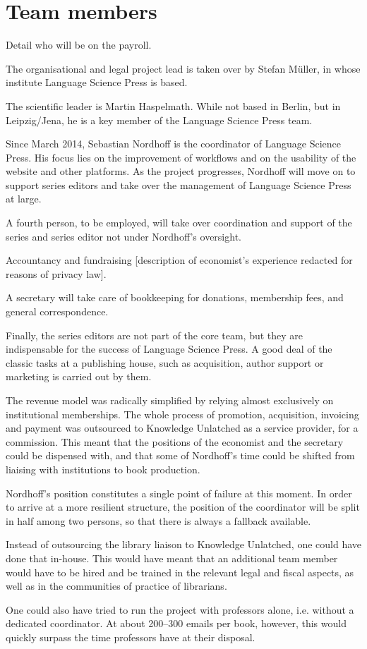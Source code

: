 \documentclass[nonflat,smallfont
]{langsci/langscibook}
\newcommand{\background}[1]{ 
  \vspace{5mm}
  \renewcommand{\tblslinecolour}{lsDarkBlue}
  \tblssy[red]{explore2}{Background}{\vspace*{-5mm}#1}
}
\newcommand{\langscisolution}[1]{
  \renewcommand{\tblslinecolour}{lsLightBlue}
  \tblssy{langsci}{LangSci solution}{\vspace*{-5mm}#1}
}
\newcommand{\evaluation}[1]{
  \renewcommand{\tblslinecolour}{lsLightOrange}
  \tblssy{receipt}{Evaluation}{\vspace*{-5mm}#1}
}
\newcommand{\othersolutions}[1]{
  \renewcommand{\tblslinecolour}{lsDarkGreenOne}
  \tblssy{more}{Other solutions}{\vspace*{-5mm}#1}
}
\renewcommand{\tblssy}[4][black!12]{%
  \renewcommand{\langscisymbol}{#2}\renewcommand{\tblsboxcolor}{#1}
  \begin{mdframed}[style=yellowexercise,frametitle={#3}]
    #4
  \end{mdframed}
}
\begin{document}
\newpage 
\section{Team members}
\vspace*{5mm}
\background{Detail who will be on the payroll. }
\langscisolution{
The organisational and legal project lead is taken over by Stefan Müller, in whose institute Language Science Press is based.

The scientific leader is Martin Haspelmath. While not based in Berlin, but in Leipzig\slash Jena, he is a key member of the Language Science Press team.

Since March 2014, Sebastian Nordhoff is the coordinator of Language Science Press. His focus lies on the improvement of workflows and on the usability of the website and other platforms. As the project progresses, Nordhoff will move on to support series editors and take over the management of Language Science Press at large.

A fourth person, to be employed, will take over coordination and support of the series and series editor not under Nordhoff's oversight. 

Accountancy and fundraising
[description of economist's experience redacted for reasons of  privacy law].

A secretary will take care of bookkeeping for donations, membership fees, and general correspondence.

Finally, the series editors are not part of the core team, but they are indispensable for the success of Language Science Press. A good deal of the classic tasks at a publishing house, such as acquisition, author support or marketing is carried out by them. 

}
\evaluation{The revenue model was radically simplified by relying almost exclusively on institutional memberships. The whole process of promotion, acquisition, invoicing and payment was outsourced to Knowledge Unlatched as a service provider, for a commission. This meant that the positions of the economist and the secretary could be dispensed with, and that some of Nordhoff's time could be shifted from liaising with institutions to book production. 

Nordhoff's position constitutes a single point of failure at this moment. In order to arrive at a more resilient structure, the position of the coordinator will be split in half among two persons, so that there is always a fallback available.
}
\othersolutions{
Instead of outsourcing the library liaison to Knowledge Unlatched, one could have done that in-house. This would have meant that an additional team member would have to be hired and be trained in the relevant legal and fiscal aspects, as well as in the communities of practice of librarians. 

One could also have tried to run the project with professors alone, i.e. without a dedicated coordinator. At about 200--300 emails per book, however, this would quickly surpass the time professors have at their disposal. 
}
 
\end{document}
